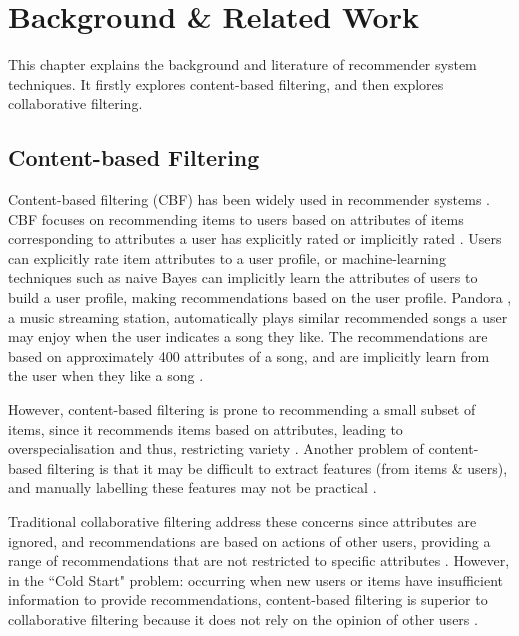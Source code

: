 \chapter{Background \& Related Work}\label{C:background}

This chapter explains the background and literature of recommender system techniques. It firstly explores content-based filtering, and then explores collaborative filtering.

\section{Content-based Filtering}

Content-based filtering (CBF) has been widely used in recommender systems \cite{koren2011, hybrid,toward, bogers2009collaborative}. CBF focuses on recommending items to users based on attributes of items corresponding to attributes a user has explicitly rated or implicitly rated \cite{koren2011}. Users can explicitly rate item attributes to a user profile, or machine-learning techniques such as naive Bayes \cite{koren2011, bogers2009collaborative} can implicitly learn the attributes of users to build a user profile, making recommendations based on the user profile. Pandora \cite{pandora, howepandora}, a music streaming station, automatically plays similar recommended songs a user may enjoy when the user indicates a song they like. The recommendations are based on approximately 400 attributes of a song, and are implicitly learn from the user when they like a song \cite{howepandora}.

However, content-based filtering is prone to recommending a small subset of items, since it recommends items based on attributes, leading to overspecialisation and thus, restricting variety \cite{toward}. Another problem of content-based filtering is that it may be difficult to extract features (from items \& users), and manually labelling these features may not be practical \cite{toward}.

Traditional collaborative filtering address these concerns since attributes are ignored, and recommendations are based on actions of other users, providing a range of recommendations that are not restricted to specific attributes \cite{koren2009matrix}. However, in the ``Cold Start" problem: occurring when new users or items have insufficient information to provide recommendations, content-based filtering is superior to collaborative filtering because it does not rely on the opinion of other users \cite{koren2009matrix}.

